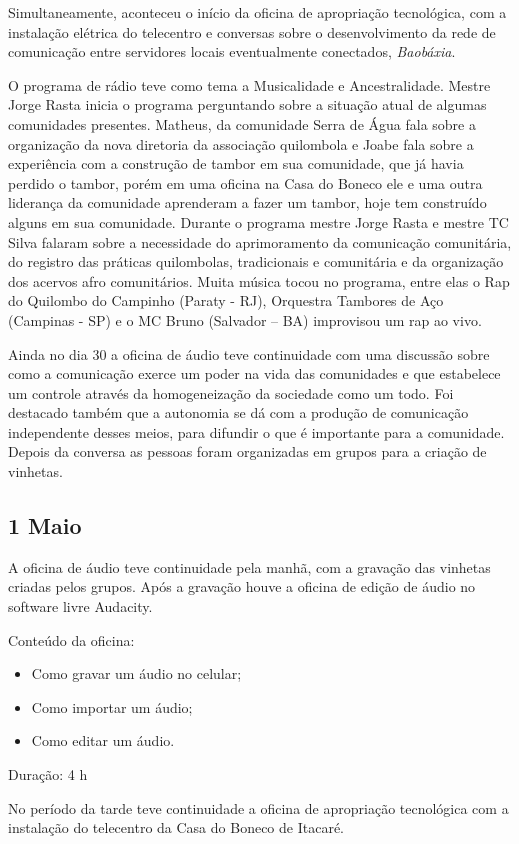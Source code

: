 \documentclass[a4paper, 11pt, oneside]{Relatorio_sem_2}  %
\begin{document}
Simultaneamente, aconteceu o início da oficina de apropriação
tecnológica, com a instalação elétrica do telecentro e conversas sobre
o desenvolvimento da rede de comunicação entre servidores locais
eventualmente conectados, \emph{Baobáxia}.

O programa de rádio teve como tema a Musicalidade e
Ancestralidade. Mestre Jorge Rasta inicia o programa perguntando sobre
a situação atual de algumas comunidades presentes. Matheus, da
comunidade Serra de Água fala sobre a organização da nova diretoria da
associação quilombola e Joabe fala sobre a experiência com a
construção de tambor em sua comunidade, que já havia perdido o tambor,
porém em uma oficina na Casa do Boneco ele e uma outra liderança da
comunidade aprenderam a fazer um tambor, hoje tem construído alguns em
sua comunidade. Durante o programa mestre Jorge Rasta e mestre TC
Silva falaram sobre a necessidade do aprimoramento da comunicação
comunitária, do registro das práticas quilombolas, tradicionais e
comunitária e da organização dos acervos afro comunitários. Muita
música tocou no programa, entre elas o Rap do Quilombo do Campinho
(Paraty - RJ), Orquestra Tambores de Aço (Campinas - SP) e o MC Bruno
(Salvador – BA) improvisou um rap ao vivo.

Ainda no dia 30 a oficina de áudio teve continuidade com uma discussão
sobre como a comunicação exerce um poder na vida das comunidades e que
estabelece um controle através da homogeneização da sociedade como um
todo. Foi destacado também que a autonomia se dá com a produção de
comunicação independente desses meios, para difundir o que é
importante para a comunidade.  Depois da conversa as pessoas foram
organizadas em grupos para a criação de vinhetas.

\subsection{1 Maio}
A oficina de áudio teve continuidade pela manhã, com a gravação das
vinhetas criadas pelos grupos. Após a gravação houve a oficina de
edição de áudio no software livre Audacity. 

Conteúdo da oficina:
\begin{itemize}
\item Como gravar um áudio no celular;
\item Como importar um áudio;
\item Como editar um áudio.
\end{itemize}
Duração: 4 h

No período da tarde teve continuidade a oficina de apropriação
tecnológica com a instalação do telecentro da Casa do Boneco de
Itacaré.  
\end{document}
